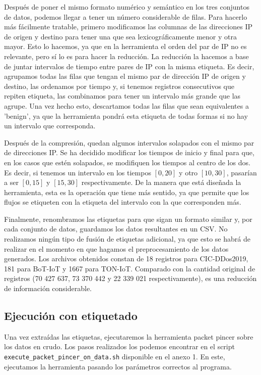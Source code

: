 Después de poner el mismo formato numérico y semántico en los tres conjuntos de datos, podemos llegar a tener un número considerable de filas. Para hacerlo más fácilmente tratable, primero modificamos las columnas de las direcciones IP de origen y destino para tener una que sea lexicográficamente menor y otra mayor. Esto lo hacemos, ya que en la herramienta el orden del par de IP no es relevante, pero sí lo es para hacer la reducción. La reducción la hacemos a base de juntar intervalos de tiempo entre pares de IP con la misma etiqueta. Es decir, agrupamos todas las filas que tengan el mismo par de dirección IP de origen y destino, las ordenamos por tiempo y, si tenemos registros consecutivos que repiten etiqueta, las combinamos para tener un intervalo más grande que las agrupe. Una vez hecho esto, descartamos todas las filas que sean equivalentes a 'benign', ya que la herramienta pondrá esta etiqueta de todas formas si no hay un intervalo que corresponda.

Después de la compresión, quedan algunos intervalos solapados con el mismo par de direcciones IP. Se ha decidido modificar los tiempos de inicio y final para que, en los casos que estén solapados, se modifiquen los tiempos al centro de los dos. Es decir, si tenemos un intervalo en los tiempos $[0, 20]$ y otro $[10, 30]$, pasarían a ser $[0, 15]$ y $[15, 30]$ respectivamente. De la manera que está diseñada la herramienta, esta es la operación que tiene más sentido, ya que permite que los flujos se etiqueten con la etiqueta del intervalo con la que corresponden más.

Finalmente, renombramos las etiquetas para que sigan un formato similar y, por cada conjunto de datos, guardamos los datos resultantes en un CSV. No realizamos ningún tipo de fusión de etiquetas adicional, ya que esto se habrá de realizar en el momento en que hagamos el preprocesamiento de los datos generados. Los archivos obtenidos constan de 18 registros para CIC-DDos2019, 181 para BoT-IoT y 1667 para TON-IoT. Comparado con la cantidad original de registros (70 427 637, 73 370 442 y 22 339 021 respectivamente), es una reducción de información considerable.

\subsection{Ejecución con etiquetado}

Una vez extraídas las etiquetas, ejecutaremos la herramienta packet pincer sobre los datos en crudo. Los pasos realizados los podemos encontrar en el script \texttt{execute\-\_packet\-\_pincer\-\_on\-\_data.sh} disponible en el anexo 1. En este, ejecutamos la herramienta pasando los parámetros correctos al programa.

